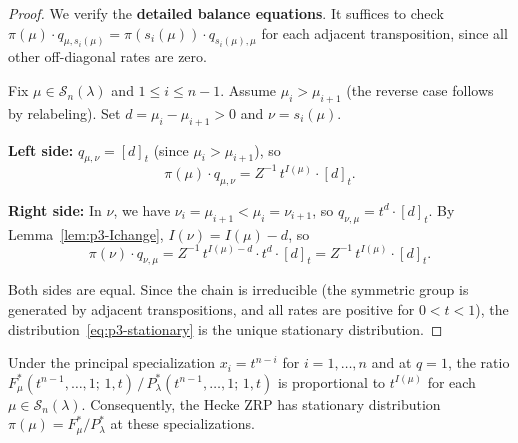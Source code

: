 \begin{proof}
We verify the \textbf{detailed balance equations}. It suffices to check
$\pi(\mu) \cdot q_{\mu,s_i(\mu)} = \pi(s_i(\mu)) \cdot q_{s_i(\mu),\mu}$
for each adjacent transposition, since all other off-diagonal rates are
zero.

Fix $\mu \in \mathcal{S}_n(\lambda)$ and $1 \leq i \leq n-1$.
Assume $\mu_i > \mu_{i+1}$ (the reverse case follows by relabeling).
Set $d = \mu_i - \mu_{i+1} > 0$ and $\nu = s_i(\mu)$.

\textbf{Left side:}
$q_{\mu,\nu} = [d]_t$ (since $\mu_i > \mu_{i+1}$), so
\[
  \pi(\mu) \cdot q_{\mu,\nu}
  = Z^{-1}\, t^{I(\mu)} \cdot [d]_t.
\]

\textbf{Right side:}
In $\nu$, we have $\nu_i = \mu_{i+1} < \mu_i = \nu_{i+1}$, so
$q_{\nu,\mu} = t^d \cdot [d]_t$.
By Lemma~\ref{lem:p3-Ichange}, $I(\nu) = I(\mu) - d$, so
\[
  \pi(\nu) \cdot q_{\nu,\mu}
  = Z^{-1}\, t^{I(\mu) - d} \cdot t^d \cdot [d]_t
  = Z^{-1}\, t^{I(\mu)} \cdot [d]_t.
\]

Both sides are equal. Since the chain is irreducible (the symmetric
group is generated by adjacent transpositions, and all rates are
positive for $0 < t < 1$), the distribution~\eqref{eq:p3-stationary}
is the unique stationary distribution.
\end{proof}

\begin{proposition}[Identification with interpolation polynomials at $q=1$]
\label{prop:p3-identification}
Under the principal specialization $x_i = t^{n-i}$ for $i = 1, \ldots, n$
and at $q = 1$, the ratio
$F^*_\mu(t^{n-1}, \ldots, 1;\, 1, t) \,/\, P^*_\lambda(t^{n-1}, \ldots, 1;\, 1, t)$
is proportional to $t^{I(\mu)}$ for each $\mu \in \mathcal{S}_n(\lambda)$.
Consequently, the Hecke ZRP has stationary distribution
$\pi(\mu) = F^*_\mu / P^*_\lambda$ at these specializations.
\end{proposition}

